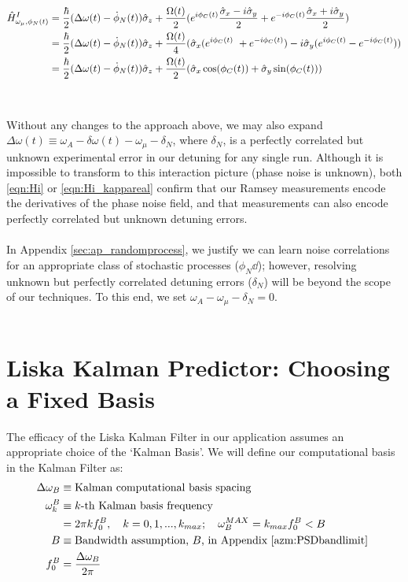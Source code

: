 \begin{align}
\hat{H}^{I}_{\omega_\mu,\phi_N(t)} & = \frac{\hbar}{2}(\Delta \omega(t)- \dot{\phi}_N(t))\hat{\sigma}_{z} + \frac{\Omega(t)}{2} (e^{i\phi_C(t)}\frac{\hat{\sigma}_{x} - i\hat{\sigma}_{y}}{2} + e^{-i\phi_C(t)}\frac{\hat{\sigma}_{x} + i\hat{\sigma}_{y}}{2})\\
& = \frac{\hbar}{2}(\Delta \omega(t)- \dot{\phi}_N(t))\hat{\sigma}_{z} + \frac{\Omega(t)}{4} (\hat{\sigma}_{x} (e^{i\phi_C(t)}\ +  e^{-i\phi_C(t)})- i\hat{\sigma}_{y} ( e^{i\phi_C(t)} - e^{-i\phi_C(t)} ))\\
& = \frac{\hbar}{2}(\Delta \omega(t)- \dot{\phi}_N(t))\hat{\sigma}_{z} + \frac{\Omega(t)}{2} (\hat{\sigma}_{x} \cos(\phi_C(t)) + \hat{\sigma}_{y} \sin(\phi_C(t))) \label{eqn:Hi_kappareal}
\end{align}
\\
\\
Without any changes to the approach above, we may also expand $\Delta \omega(t) \equiv \omega_A - \delta \omega(t)-\omega_\mu -\delta_N$, where $\delta_N$, is a perfectly correlated but unknown experimental error in our detuning for any single run. Although it is impossible to transform to this interaction picture (phase noise is unknown), both \ref{eqn:Hi} or \ref{eqn:Hi_kappareal} confirm that our Ramsey measurements encode the derivatives of the phase noise field, and that measurements can also encode perfectly correlated but unknown detuning errors.
\\
\\
In Appendix \ref{sec:ap_randomprocess}, we justify we can learn noise correlations for an appropriate class of stochastic processes ($\phi_N\dd$); however, resolving unknown but perfectly correlated detuning errors ($\delta_N$) will be beyond the scope of our techniques. To this end, we set $\omega_A - \omega_\mu - \delta_N = 0$.
\\
\\
\section{Liska Kalman Predictor: Choosing a Fixed Basis} \label{sec:ap_liska_fixedbasis}

The efficacy of the Liska Kalman Filter in our application assumes an appropriate choice of the `Kalman Basis'. We will define our computational basis in the Kalman Filter as:
\begin{align}
\Delta \omega_B  &\equiv \text{Kalman computational basis spacing} \\
\omega_k^B &\equiv \text{$k$-th Kalman basis frequency} \\
&= 2 \pi k f_0^B, \quad k = 0, 1, ..., k_{max};  \quad \omega_B^{MAX} = k_{max} f_0^B < B \\
B  &\equiv \text{Bandwidth assumption, $B$,  in Appendix \ref{azm:PSDbandlimit} } \\
f_0^B &=  \frac{\Delta \omega_B}{2 \pi}
\end{align}

